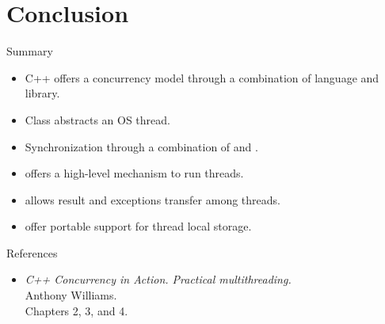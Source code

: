 \section{Conclusion}

\begin{frame}[t]{Summary}
\begin{itemize}
  \item C++ offers a concurrency model through a combination of
        language and library.
  \item Class  abstracts an OS thread.
  \item Synchronization through a combination of  and .
  \item {} offers a high-level mechanism to run threads.
  \item {} allows result and exceptions transfer among threads.
  \item {} offer portable support for thread local storage.
\end{itemize}
\end{frame}

\begin{frame}[t]{References}
\begin{itemize}
  \item \emph{C++ Concurrency in Action. Practical multithreading.}\\
  Anthony Williams.\\
  Chapters 2, 3, and 4.
\end{itemize}
\end{frame}
